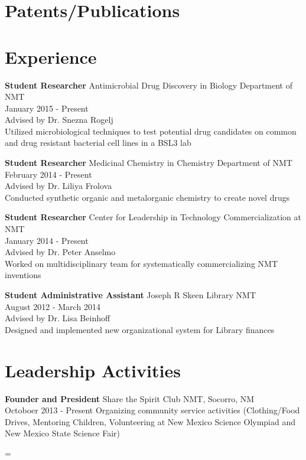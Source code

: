 \documentclass[margin]{res}
\newenvironment{nobreaker}
{\par\nobreak\vfil\penalty0\vfilneg\vtop\bgroup}
{\par\xdef\tpd{\the\prevdepth}\egroup\prevdepth=\tpd}
\begin{document}
\begin{nobreaker}
\begin{resume}
\section{Patents/Publications}
 

\section{Experience}
{\bf Student Researcher}
Antimicrobial Drug Discovery in Biology Department of NMT\\
January 2015 - Present\\
Advised by Dr. Snezna Rogelj\\
 Utilized microbiological techniques to test potential drug candidates on common and drug resistant bacterial cell lines in a BSL3 lab


 {\bf Student Researcher}
 Medicinal Chemistry in Chemistry Department of NMT\\
 February 2014 - Present\\
 Advised by Dr. Liliya Frolova\\
 Conducted synthetic organic and metalorganic chemistry to create novel drugs

 
{\bf Student Researcher}
 Center for Leadership in Technology Commercialization at NMT\\
 January 2014 - Present\\
 Advised by Dr. Peter Anselmo\\
 Worked on multidisciplinary team for systematically commercializing NMT inventions


{\bf Student Administrative Assistant}
Joseph R Skeen Library NMT\\
 August 2012 - March 2014\\
 Advised by Dr. Lisa Beinhoff\\             
  Designed and implemented new organizational system for Library finances


\section{Leadership   Activities} 
               {\bf Founder and President} Share the Spirit Club NMT, Socorro, NM \\
	 Octoboer 2013 - Present
                Organizing community service activities (Clothing/Food Drives, Mentoring Children, Volunteering at New Mexico Science Olympiad and New Mexico State Science Fair)





\end{resume} 
\end{nobreaker}
\end{document}
